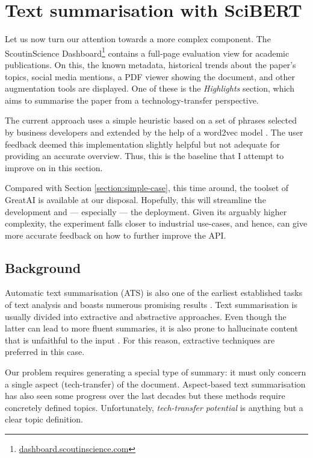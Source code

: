 \section{Text summarisation with SciBERT} \label{section:complex-case}

Let us now turn our attention towards a more complex component. The ScoutinScience Dashboard\footnote{\href{https://dashboard.scoutinscience.com/}{dashboard.scoutinscience.com}} contains a full-page evaluation view for academic publications. On this, the known metadata, historical trends about the paper's topics, social media mentions, a PDF viewer showing the document, and other augmentation tools are displayed. One of these is the \textit{Highlights} section, which aims to summarise the paper from a technology-transfer perspective.

The current approach uses a simple heuristic based on a set of phrases selected by business developers and extended by the help of a word2vec model \cite{mikolov2013efficient}. The user feedback deemed this implementation slightly helpful but not adequate for providing an accurate overview. Thus, this is the baseline that I attempt to improve on in this section.

\begin{displayquote}
Compared with Section \ref{section:simple-case}, this time around, the toolset of GreatAI is available at our disposal. Hopefully, this will streamline the development and --- especially --- the deployment. Given its arguably higher complexity, the experiment falls closer to industrial use-cases, and hence, can give more accurate feedback on how to further improve the API.
\end{displayquote}

\subsection{Background}

Automatic text summarisation (ATS) is also one of the earliest established tasks of text analysis and boasts numerous promising results \cite{el2021automatic}. Text summarisation is usually divided into extractive and abstractive approaches. Even though the latter can lead to more fluent summaries, it is also prone to hallucinate content that is unfaithful to the input \cite{maynez2020faithfulness}. For this reason, extractive techniques are preferred in this case.

Our problem requires generating a special type of summary: it must only concern a single aspect (tech-transfer) of the document. Aspect-based text summarisation has also seen some progress over the last decades \cite{berkovsky2008aspect,hayashi2021wikiasp} but these methods require concretely defined topics. Unfortunately, \textit{tech-transfer potential} is anything but a clear topic definition.

